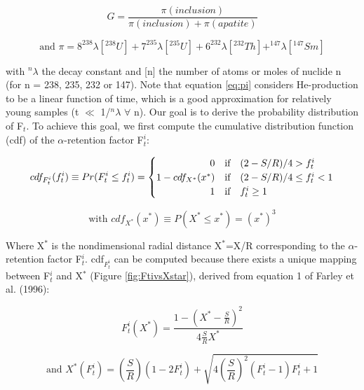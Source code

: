 \documentclass{article}
\begin{document}
\begin{equation}
  \label{eq:G}
  G = \frac{\pi(inclusion)}{\pi(inclusion)+\pi(apatite)}
\end{equation}

\begin{equation}
  \label{eq:pi}
  \mbox{and~} \pi = 8^{238}\lambda[^{238}U] + 7^{235}\lambda[^{235}U] + 
        6^{232}\lambda[^{232}Th] + ^{147}\lambda[^{147}Sm] 
\end{equation}

with $^n\lambda$  the decay  constant and [n]  the number of  atoms or
moles of nuclide n (for n =  238, 235, 232 or 147). Note that equation
\ref{eq:pi} considers  He-production to be a linear  function of time,
which is  a good approximation  for relatively young samples  (t $\ll$
1/$^{n}\lambda$ $\forall$  n).  Our goal is to  derive the probability
distribution of  F$_t$.  To  achieve this goal,  we first  compute the
cumulative  distribution  function  (cdf)  of  the  $\alpha$-retention
factor F$_t^i$:

\begin{equation}
  \label{eq:CDFti}
cdf_{F_t^i}(f_t^i) \equiv Pr(F_t^i \leq f_t^i) = \begin{cases}
           \hfill 0 &\text{if} \quad (2-S/R)/4 > f_t^i \\
           \hfill 1 - cdf_{X^*}(x^*)
                  &\text{if} \quad (2-S/R)/4 \leq f_t^i < 1 \\
           \hfill 1 &\text{if} \quad f_t^i \geq 1 \\
         \end{cases}
\end{equation}

\begin{equation}
  \label{eq:cdfX}
\mbox{with~}  cdf_{X^*}(x^*) \equiv P(X^* \leq x^*) = \left(x^*\right)^3
\end{equation}

Where   X$^*$  is   the  nondimensional   radial   distance  X$^*$=X/R
corresponding to the $\alpha$-retention factor F$^i_t$.  cdf$_{F_t^i}$
can be computed because there  exists a unique mapping between F$_t^i$
and X$^*$  (Figure \ref{fig:FtivsXstar}),  derived from equation  1 of
Farley et al. (1996):

\begin{equation}
  \label{eq:FtvsXR}
  F_t^i\left(X^*\right) = 
  \frac{1-\left(X^*-\frac{S}{R}\right)^2}{4\frac{S}{R}X^*}
\end{equation}

\begin{equation}
  \label{eq:xRvsFt}
\mbox{and~}  X^*\left(F_t^i\right) = \left(\frac{S}{R}\right)\left(1-2F_t^i\right) +
             \sqrt{4\left(\frac{S}{R}\right)^2\left(F_t^i-1\right)F_t^i + 1}
\end{equation}
\end{document}
